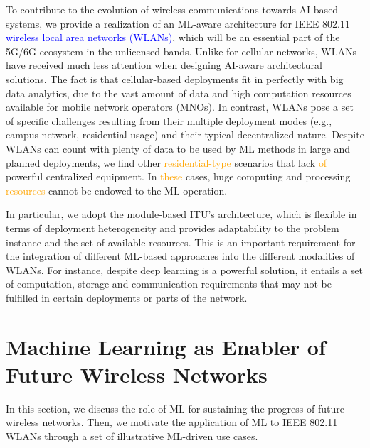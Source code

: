 \documentclass[journal]{IEEEtran}
\begin{document}
To contribute to the evolution of wireless communications towards AI-based systems, we provide a realization of an ML-aware architecture for IEEE 802.11 \textcolor{blue}{wireless local area networks (WLANs)}, which will be an essential part of the 5G/6G ecosystem in the unlicensed bands. Unlike for cellular networks, WLANs have received much less attention when designing AI-aware architectural solutions. The fact is that cellular-based deployments fit in perfectly with big data analytics, due to the vast amount of data and high computation resources available for mobile network operators (MNOs). In contrast, WLANs pose a set of specific challenges resulting from their multiple deployment modes (e.g., campus network, residential usage) and their typical decentralized nature. Despite WLANs can count with plenty of data to be used by ML methods in large and planned deployments, we find other  \textcolor{orange}{residential-type} scenarios that lack \textcolor{orange}{of} powerful centralized equipment. In  \textcolor{orange}{these} cases, huge computing and processing  \textcolor{orange}{resources} cannot be endowed to the ML operation.

In particular, we adopt the module-based ITU's architecture, which is flexible in terms of deployment heterogeneity and provides adaptability to the problem instance and the set of available resources. This is an important requirement for the integration of different ML-based approaches into the different modalities of WLANs. For instance, despite deep learning is a powerful solution, it entails a set of computation, storage and communication requirements that may not be fulfilled in certain deployments or parts of the network.

\section{Machine Learning as Enabler of Future Wireless Networks} 
\label{section:intro_ML}
In this section, we discuss the role of ML for sustaining the progress of future wireless networks. Then, we motivate the application of ML to IEEE 802.11 WLANs through a set of illustrative ML-driven use cases.
\end{document}
